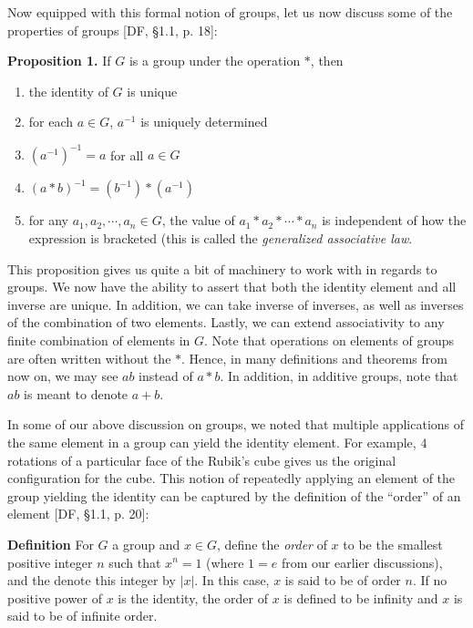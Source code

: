 \documentclass[11pt, reqno]{amsart}
\theoremstyle{plain}
\theoremstyle{definition}
\theoremstyle{example}
\begin{document}
\par
Now equipped with this formal notion of groups, let us now discuss some of the properties of groups [DF, \S 1.1, p. 18]:

\par
\textbf{Proposition 1.} If $G$ is a group under the operation $*$, then
\begin{enumerate}
\item the identity of $G$ is unique
\item for each $a \in G$, $a^{-1}$ is uniquely determined
\item $(a^{-1})^{-1} = a$ for all $a \in G$
\item $(a * b)^{-1} = (b^{-1}) * (a^{-1})$
\item for any $a_1, a_2, \cdots, a_n \in G$, the value of $a_1 * a_2 * \cdots * a_n$ is independent of how the expression is bracketed (this is called the \textit{generalized associative law}.
\end{enumerate}

\par
This proposition gives us quite a bit of machinery to work with in regards to groups. We now have the ability to assert that both the identity element and all inverse are unique. In addition, we can take inverse of inverses, as well as inverses of the combination of two elements. Lastly, we can extend associativity to any finite combination of elements in $G$. Note that operations on elements of groups are often written without the $*$. Hence, in many definitions and theorems from now on, we may see $ab$ instead of $a * b$. In addition, in additive groups, note that $ab$ is meant to denote $a + b$.

\par
In some of our above discussion on groups, we noted that multiple applications of the same element in a group can yield the identity element. For example, $4$ rotations of a particular face of the Rubik's cube gives us the original configuration for the cube. This notion of repeatedly applying an element of the group yielding the identity can be captured by the definition of the ``order'' of an element [DF, \S 1.1, p. 20]:

\par
\textbf{Definition} For $G$ a group and $x \in G$, define the \textit{order} of $x$ to be the smallest positive integer $n$ such that $x^n = 1$ (where $1 = e$ from our earlier discussions), and the denote this integer by $|x|$. In this case, $x$ is said to be of order $n$. If no positive power of $x$ is the identity, the order of $x$ is defined to be infinity and $x$ is said to be of infinite order.
\end{document}
